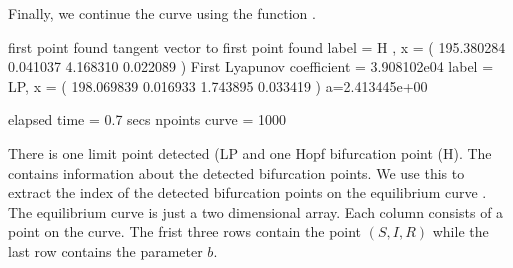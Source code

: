 \documentclass[letterpaper,10pt,english]{jupyterBook}
\begin{document}
\sphinxAtStartPar
Finally, we continue the curve using the function .

\begin{sphinxVerbatim}[commandchars=\\\{\}]
\PYG{p}{[}\PYG{p}{]}
\PYG{p}{[}\PYG{p}{]}
\end{sphinxVerbatim}

\begin{sphinxVerbatim}[commandchars=\\\{\}]
first point found
tangent vector to first point found
label = H , x = ( 195.380284 0.041037 4.168310 0.022089 )
First Lyapunov coefficient = 3.908102e\PYGZhy{}04
label = LP, x = ( 198.069839 0.016933 1.743895 0.033419 )
a=\PYGZhy{}2.413445e+00

elapsed time  = 0.7 secs
npoints curve = 1000
\end{sphinxVerbatim}

\sphinxAtStartPar
There is one limit point detected (LP and one Hopf bifurcation point (H). The
  contains information about the detected
bifurcation points. We use this to extract the index of the detected bifurcation
points on the equilibrium curve . The equilibrium curve  is
just a two dimensional array. Each column consists of a point on the curve.
The frist three rows contain the point \((S,I,R)\) while the last row contains
the parameter \(b\).
\end{document}
